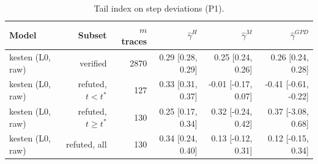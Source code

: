 \begin{table}[t]
\centering
\begin{tabular}{lrrrrr}
\toprule
Model & Subset & $m$ traces & $\hat{\gamma}^H$ & $\hat{\gamma}^M$ & $\hat{\gamma}^{GPD}$ \\
\midrule
kesten (L0, raw) & verified & 2870 & 0.29 [0.28, 0.29] & 0.25 [0.24, 0.26] & 0.26 [0.24, 0.28] \\
kesten (L0, raw) & refuted, $t<t^*$ & 127 & 0.33 [0.31, 0.37] & -0.01 [-0.17, 0.07] & -0.41 [-0.61, -0.22] \\
kesten (L0, raw) & refuted, $t \geq t^*$ & 130 & 0.25 [0.17, 0.34] & 0.32 [-0.24, 0.42] & 0.37 [-3.08, 0.68] \\
kesten (L0, raw) & refuted, all & 130 & 0.34 [0.24, 0.40] & 0.13 [-0.12, 0.31] & 0.12 [-0.15, 0.34] \\
\bottomrule
\end{tabular}
\caption{Tail index on step deviations (P1).}
\label{tab:table1-kesten-p0.05}
\end{table}
